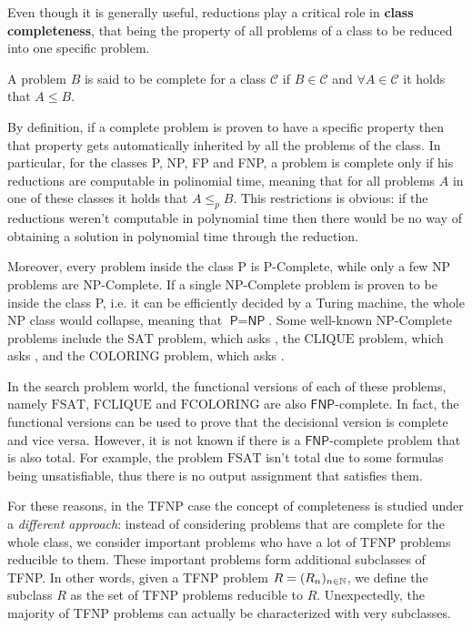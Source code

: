 Even though it is generally useful, reductions play a critical role in \textbf{class completeness}, that being the property of all problems of a class to be reduced into one specific problem. 

\begin{definition}
    A problem $B$ is said to be complete for a class $\mathcal{C}$ if $B \in \mathcal{C}$ and $\forall A \in \mathcal{C}$ it holds that $A \leq B$.
\end{definition}

By definition, if a complete problem is proven to have a specific property then that property gets automatically inherited by all the problems of the class. In particular, for the classes \textsf{P}, \textsf{NP}, \textsf{FP} and \textsf{FNP}, a problem is complete only if his reductions are computable in polinomial time, meaning that for all problems $A$ in one of these classes it holds that $A \leq_p B$. This restrictions is obvious: if the reductions weren't computable in polynomial time then there would be no way of obtaining a solution in polynomial time through the reduction.

Moreover, every problem inside the class \textsf{P} is \textsf{P}-Complete, while only a few \textsf{NP} problems are \textsf{NP}-Complete. If a single \textsf{NP}-Complete problem is proven to be inside the class \textsf{P}, i.e. it can be efficiently decided by a Turing machine, the whole \textsf{NP} class would collapse, meaning that $\textsf{P} = \textsf{NP}$. Some well-known \textsf{NP}-Complete problems include the $\mathrm{SAT}$ problem, which asks , the $\mathrm{CLIQUE}$ problem, which asks , and the $\mathrm{COLORING}$ problem, which asks .

In the search problem world, the functional versions of each of these problems, namely $\mathrm{FSAT}$, $\mathrm{FCLIQUE}$ and $\mathrm{FCOLORING}$ are also $\textsf{FNP}$-complete. In fact, the functional versions can be used to prove that the decisional version is complete and vice versa. However, it is not known if there is a $\textsf{FNP}$-complete problem that is also total. For example, the problem $\mathrm{FSAT}$ isn't total due to some formulas being unsatisfiable, thus there is no output assignment that satisfies them.

For these reasons, in the \textsf{TFNP} case the concept of completeness is studied under a \textit{different approach}: instead of considering problems that are complete for the whole class, we consider important problems who have a lot of \textsf{TFNP} problems reducible to them. These important problems form additional subclasses of \textsf{TFNP}. In other words, given a \textsf{TFNP} problem $R = (R_n)_{n \in \mathbb{N}}$, we define the subclass $R$ as the set of \textsf{TFNP} problems reducible to $R$. Unexpectedly, the majority of \textsf{TFNP} problems can actually be characterized with very subclasses.

